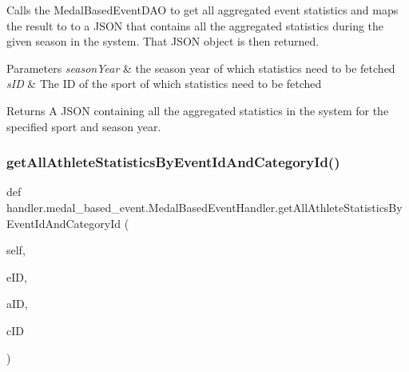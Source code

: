 Calls the Medal\+Based\+Event\+D\+AO to get all aggregated event statistics and maps the result to to a J\+S\+ON that contains all the aggregated statistics during the given season in the system. That J\+S\+ON object is then returned.


\begin{DoxyParams}{Parameters}
{\em season\+Year} & the season year of which statistics need to be fetched \\
\hline
{\em s\+ID} & The ID of the sport of which statistics need to be fetched\\
\hline
\end{DoxyParams}
\begin{DoxyReturn}{Returns}
A J\+S\+ON containing all the aggregated statistics in the system for the specified sport and season year. 
\end{DoxyReturn}
\mbox{\label{classhandler_1_1medal__based__event_1_1_medal_based_event_handler_aca6e718ba806e512d839cc373e7ca438}} 
\subsubsection{\texorpdfstring{get\+All\+Athlete\+Statistics\+By\+Event\+Id\+And\+Category\+Id()}{getAllAthleteStatisticsByEventIdAndCategoryId()}}
{\footnotesize\ttfamily def handler.\+medal\+\_\+based\+\_\+event.\+Medal\+Based\+Event\+Handler.\+get\+All\+Athlete\+Statistics\+By\+Event\+Id\+And\+Category\+Id (\begin{DoxyParamCaption}\item[{}]{self,  }\item[{}]{e\+ID,  }\item[{}]{a\+ID,  }\item[{}]{c\+ID }\end{DoxyParamCaption})}



